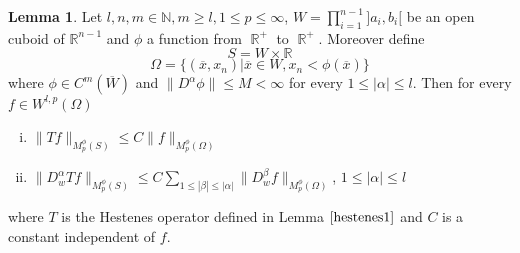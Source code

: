 \documentclass[12pt]{article}
\theoremstyle{definition}
\newtheorem{lemma}{Lemma}
\DeclareMathOperator\rr{\mathbb{R}}
\begin{document}
\begin{lemma}\label{hmorrey1}
Let $l,n,m \in \mathbb{N},m\ge l, 1\le p \le \infty$, $W = \prod\limits_{i=1}^{n-1}]a_i,b_i[$ be an open cuboid of $\mathbb{R}^{n-1}$ and $\phi$ a function from $\rr^+$ to $\rr^+$. Moreover define
\[ S=W \times \mathbb{R} \]
\[\Omega =\{ (\overline x,x_n) | \overline x\in W, x_n<\phi(\overline x)  \} \]
where $\phi \in C^m(\overline W)$ and $\| D^{\alpha}\phi \|\le M <\infty $ for every $1\le|\alpha|\le l$. Then for every $f \in W^{l,p}(\Omega)$ 
\begin{enumerate}[i)]
\item  $\| Tf\|_{M_p^\phi(S)} \le    C\| f\|_{M_p^\phi(\Omega)}$
\item $\| D^\alpha_w Tf\|_{M_p^\phi(S)} \le   C\sum_{1\le |\beta|\le|\alpha| }\| D^\beta_wf\|_{M_p^\phi(\Omega)}$,  $1\le |\alpha|\le l$
\end{enumerate}
where $T$ is the Hestenes operator defined in Lemma $\ref{hestenes1}$ and $C$ is a constant independent of $f$.
\end{lemma}
\end{document}

